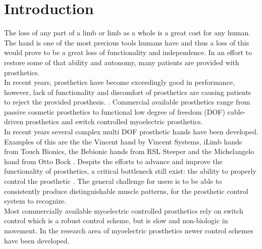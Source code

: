 
\section{Introduction}			%


%


The loss of any part of a limb or limb as a whole is a great cost for any human. The hand is one of the most precious tools humans have and thus a loss of this would prove to be a great loss of functionality and independence. In an effort to restore some of that ability and autonomy, many patients are provided with prosthetics. \\
In recent years, prosthetics have become exceedingly good in performance, however, lack of functionality and discomfort of prosthetics are causing patients to reject the provided prosthesis. \cite{Reiber2010}. Commercial available prosthetics range from passive cosmetic prosthetics to functional low degree of freedom (DOF) cable-driven prosthetics and switch controlled myoelectric prosthetics. \\
In recent years several complex multi DOF prosthetic hands have been developed. Examples of this are the the Vincent hand by Vincent Systems, iLimb hands from Touch Bionics, the Bebionic hands from RSL Steeper and the Michelangelo hand from Otto Bock \cite{Belter2013}. Despite the efforts to advance and improve the functionality of prosthetics, a critical bottleneck still exist: the ability to properly control the prosthetic \cite{Hwang2017}. The general challenge for users is to be able to consistently produce distinguishable muscle patterns, for the prosthetic control system to recognize. \cite{Powell2014} \\
Most commercially available myoelectric controlled prosthetics rely on switch control which is a robust control scheme, but is slow and non-biologic in movement. In the research area of myoelectric prosthetics newer control schemes have been developed. %
